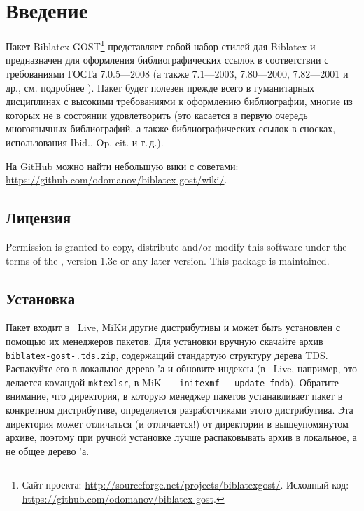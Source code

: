 \documentclass[10pt,a4paper,headings=small,numbers=enddot,english,russian]{ltxdockit}
\newcommand*{\biblatex}{Biblatex\xspace}
\newcommand*{\biblatexgost}{Biblatex-GOST\xspace}
\begin{document}
\printtitlepage
\tableofcontents
\listoftables

\section{Введение}
\label{sec:int}

Пакет \biblatexgost{}\footnote{Сайт проекта:
  \url{http://sourceforge.net/projects/biblatexgost/}. Исходный код:
  \url{https://github.com/odomanov/biblatex-gost}.} представляет собой
набор стилей для
\biblatex{}\unspace{}
и предназначен для оформления библиографических ссылок в соответствии
с требованиями ГОСТа 7.0.5---2008 (а также 7.1---2003, 7.80---2000,
7.82---2001 и др., см. подробнее ).
Пакет будет полезен прежде всего в гуманитарных дисциплинах с высокими
требованиями к оформлению библиографии, многие из которых \bibtex не в
состоянии удовлетворить (это касается в первую очередь многоязычных
библиографий, а также библиографических ссылок в сносках,
использования Ibid., Op. cit. и т.\,д.).

На GitHub можно найти небольшую вики с советами:
\url{https://github.com/odomanov/biblatex-gost/wiki/}.

\subsection{Лицензия}
\label{sec:lic}

Permission is granted to copy, distribute and\slash or modify this software under the
terms of the \lppl, version 1.3c or any later
version.
This package is maintained.

\subsection{Установка}
\label{sec:install}

Пакет входит в \tex~Live, MiK\tex и другие дистрибутивы и может быть установлен
с помощью их менеджеров пакетов. Для установки вручную скачайте архив
\texttt{biblatex-gost-.tds.zip}, содержащий стандартую структуру дерева TDS.
Распакуйте его в локальное дерево \tex'а и
обновите индексы (в \tex~Live, например, это делается командой \texttt{mktexlsr},
в MiK\tex~--- \texttt{initexmf -{}-update-fndb}). Обратите внимание, что директория,
в которую менеджер пакетов устанавливает пакет в конкретном дистрибутиве,
определяется разработчиками этого дистрибутива.
Эта директория может отличаться (и отличается!) от директории
в вышеупомянутом архиве, поэтому при ручной установке лучше распаковывать
архив в локальное, а не общее дерево \tex'а.
\end{document}
